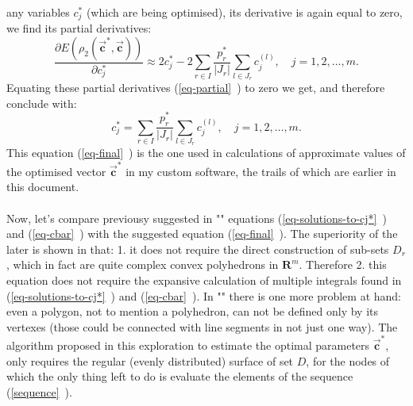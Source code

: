 \documentclass[11pt,a4paper]{article}
\numberwithin{equation}{subsection}
\newcommand{\vecc}{\vec{\textbf{c}}}
\begin{document}
any variables $c_{j}^{*}$ (which are being optimised), its derivative is again equal to zero, we find its partial derivatives:
\begin{equation}
\frac{\partial E (\rho_{2}(\vecc^{*},\vecc))}{\partial c_{j}^{*}} \approx 2c_{j}^{*} - 2 \sum\limits_{r \in I} \frac{p_{r}^{*}}{\left| J_{r} \right|} \sum\limits_{l \in J_{r}} c_{j}^{(l)}, \quad j=1,2,\dots,m. \label{eq-partial}
\end{equation}
Equating these partial derivatives (\vref{eq-partial}~) to zero we get, and therefore conclude with:
\begin{equation}
c_{j}^{*} = \sum\limits_{r \in I} \frac{p_{r}^{*}}{\left| J_{r} \right|} \sum\limits_{l \in J_{r}} c_{j}^{(l)}, \quad j=1,2,\dots,m. \label{eq-final}
\end{equation}
This equation (\vref{eq-final}~) is the one used in calculations of approximate values of the optimised vector $\vecc^{*}$ in my custom software, the trails of which are earlier  in this document.\\
\\
Now, let's compare previousy suggested in "\cite{balk_2010}" equations (\vref{eq-solutions-to-cj*}~) and (\vref{eq-cbar}~) with the suggested equation (\vref{eq-final}~). The superiority of the later is shown in that: 1. it does not require the direct construction of sub-sets $D_{r}$
, which in fact are quite complex convex polyhedrons in $\boldsymbol{R}^{m}$. Therefore 2. this equation does not require the expansive calculation of multiple integrals found in (\vref{eq-solutions-to-cj*}~) and (\vref{eq-cbar}~).  In "\cite{balk_2010}" there is one more problem at hand: even a polygon, not to mention a polyhedron, can not be defined only by its vertexes (those could be connected with line segments in not just one way). The algorithm proposed in this exploration to estimate the optimal parameters $\vecc^{*}$, only requires the regular (evenly distributed) surface of set $D$, for the nodes of which the only thing left to do is evaluate the elements of the sequence (\vref{sequence}~).

\newpage



\end{document}
